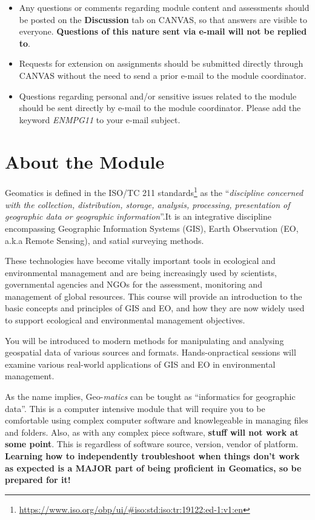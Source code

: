 \documentclass[
]{book}
\renewcommand{\href}[2]{#2\footnote{\url{#1}}}
\let\BeginKnitrBlock\begin \let\EndKnitrBlock\end
\begin{document}
\begin{itemize}
\item
  Any questions or comments regarding module content and assessments should be posted on the \textbf{Discussion} tab on CANVAS, so that answers are visible to everyone. \textbf{Questions of this nature sent via e-mail will not be replied to}.
\item
  Requests for extension on assignments should be submitted directly through CANVAS without the need to send a prior e-mail to the module coordinator.
\item
  Questions regarding personal and/or sensitive issues related to the module should be sent directly by e-mail to the module coordinator. Please add the keyword \emph{ENMPG11} to your e-mail subject.
\end{itemize}

\hypertarget{about-the-module}{%
\section{About the Module}\label{about-the-module}}

Geomatics is defined in the \href{https://www.iso.org/obp/ui/\#iso:std:iso:tr:19122:ed-1:v1:en}{ISO/TC 211 standards} as the ``\emph{discipline concerned with the collection, distribution, storage, analysis, processing, presentation of geographic data or geographic information}''.It is an integrative discipline encompassing Geographic Information Systems (GIS), Earth Observation (EO, a.k.a Remote Sensing), and satial surveying methods.

These technologies have become vitally important tools in ecological and environmental management and are being increasingly used by scientists, governmental agencies and NGOs for the assessment, monitoring and management of global resources. This course will provide an introduction to the basic concepts and principles of GIS and EO, and how they are now widely used to support ecological and environmental management objectives.

You will be introduced to modern methods for manipulating and analysing geospatial data of various sources and formats. Hands-onpractical sessions will examine various real-world applications of GIS and EO in environmental management.

\BeginKnitrBlock{rmdimportant}
As the name implies, Geo-\emph{matics} can be tought as ``informatics for geographic data''. This is a computer intensive module that will require you to be comfortable using complex computer software and knowlegeable in managing files and folders. Also, as with any complex piece software, \textbf{stuff will not work at some point}. This is regardless of software source, version, vendor of platform. \textbf{Learning how to independently troubleshoot when things don't work as expected is a MAJOR part of being proficient in Geomatics, so be prepared for it!}
\EndKnitrBlock{rmdimportant}
\end{document}
